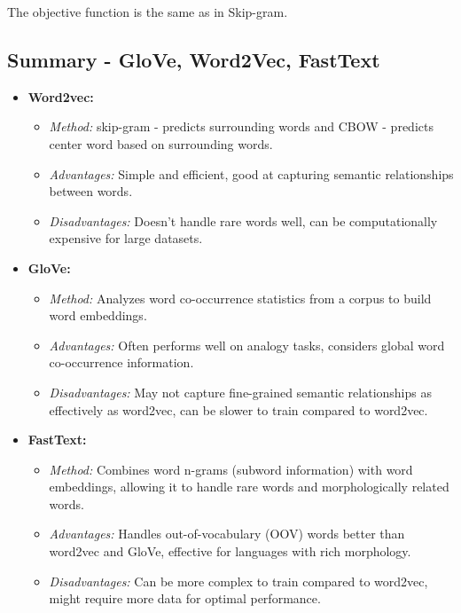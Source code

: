 \documentclass[12pt]{article}
\begin{document}
            The objective function is the same as in Skip-gram.
    \subsection{Summary - GloVe, Word2Vec, FastText}
        \begin{itemize}
        \item \textbf{Word2vec:}
        \begin{itemize}
            \item \textit{Method:} skip-gram - predicts surrounding words
             and CBOW - predicts center word based on surrounding words.
            \item \textit{Advantages:} Simple and efficient, good at capturing semantic relationships between words.
            \item \textit{Disadvantages:} Doesn't handle rare words well, can be computationally expensive for large datasets.
        \end{itemize}
        \item \textbf{GloVe:}
        \begin{itemize}
            \item \textit{Method:} Analyzes word co-occurrence statistics from a corpus to build word embeddings.
            \item \textit{Advantages:} Often performs well on analogy tasks, considers global word co-occurrence information.
            \item \textit{Disadvantages:} May not capture fine-grained semantic relationships as effectively as word2vec, can be slower to train compared to word2vec.
        \end{itemize}
        \item \textbf{FastText:}
        \begin{itemize}
            \item \textit{Method:} Combines word n-grams (subword information) with word embeddings, allowing it to handle rare words and morphologically related words.
            \item \textit{Advantages:} Handles out-of-vocabulary (OOV) words better than word2vec and GloVe, effective for languages with rich morphology.
            \item \textit{Disadvantages:} Can be more complex to train compared to word2vec, might require more data for optimal performance.
        \end{itemize}
    \end{itemize}
    
\end{document}
